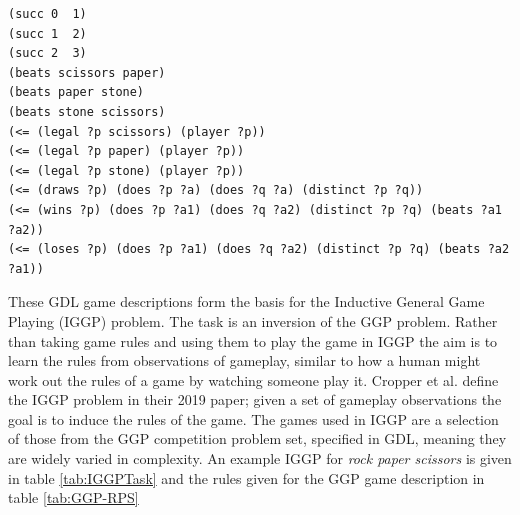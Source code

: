\begin{listing}[ht]
\begin{Verbatim}[frame=single,fontsize=\footnotesize]
(succ 0  1)
(succ 1  2)
(succ 2  3)
(beats scissors paper)
(beats paper stone)
(beats stone scissors)
(<= (legal ?p scissors) (player ?p))
(<= (legal ?p paper) (player ?p))
(<= (legal ?p stone) (player ?p))
(<= (draws ?p) (does ?p ?a) (does ?q ?a) (distinct ?p ?q))
(<= (wins ?p) (does ?p ?a1) (does ?q ?a2) (distinct ?p ?q) (beats ?a1 ?a2))
(<= (loses ?p) (does ?p ?a1) (does ?q ?a2) (distinct ?p ?q) (beats ?a2 ?a1))
\end{Verbatim}
\caption{
A sample of rules from the GDL description of Rock Paper Scissors. The $?$ indicates a variable and $<=$ indicates an implication with the first expression after being the head and the conjugation of the rest making up the body
}
\label{lst:GDL}
\end{listing}



These GDL game descriptions form the basis for the Inductive General Game Playing (IGGP) problem\cite{Cropper/IGGP}. The task is an inversion of the GGP problem. Rather than taking game rules and using them to play the game in IGGP the aim is to learn the rules from observations of gameplay, similar to how a human might work out the rules of a game by watching someone play it. Cropper et al. define the IGGP problem in their 2019 paper; given a set of gameplay observations the goal is to induce the rules of the game\cite{Cropper/IGGP}. The games used in IGGP are a selection of those from the GGP competition problem set, specified in GDL, meaning they are widely varied in complexity. An example IGGP for \textit{rock paper scissors} is given in table \ref{tab:IGGPTask} and the rules given for the GGP game description in table \ref{tab:GGP-RPS}

